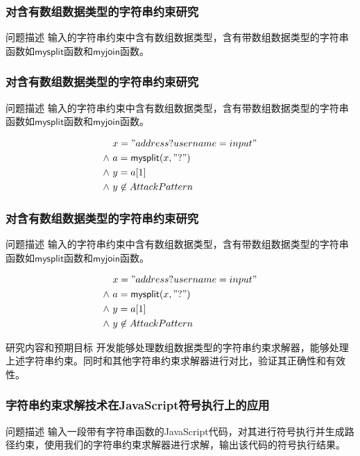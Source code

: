 \documentclass[landscape]{beamer}
\newcommand{\mysplit}{\mathsf{mysplit}}
\newcommand{\myjoin}{\mathsf{myjoin}}
\begin{document}
\begin{frame}[fragile, t]
  \frametitle{对含有数组数据类型的字符串约束研究}
  \begin{block}{问题描述}
    输入的字符串约束中含有数组数据类型，含有带数组数据类型的字符串函数如$\mysplit$函数和$\myjoin$函数。
  \end{block}
\end{frame}

\begin{frame}[fragile, t]
  \frametitle{对含有数组数据类型的字符串约束研究}
  \begin{block}{问题描述}
    输入的字符串约束中含有数组数据类型，含有带数组数据类型的字符串函数如$\mysplit$函数和$\myjoin$函数。
  \end{block}
  \begin{align*}
    & \ x = "address?username=input" \\
    \wedge & \ a = \mysplit(x, "?")\\
    \wedge &\ y = a[1]\\
    \wedge &\ y \not \in AttackPattern\\
  \end{align*}
\end{frame}

\begin{frame}[fragile, t]
  \frametitle{对含有数组数据类型的字符串约束研究}
  \begin{block}{问题描述}
    输入的字符串约束中含有数组数据类型，含有带数组数据类型的字符串函数如$\mysplit$函数和$\myjoin$函数。
  \end{block}
  \begin{align*}
    & \ x = "address?username=input" \\
    \wedge & \ a = \mysplit(x, "?")\\
    \wedge &\ y = a[1]\\
    \wedge &\ y \not \in AttackPattern\\
  \end{align*}
  \begin{block}{研究内容和预期目标}
    开发能够处理数组数据类型的字符串约束求解器，能够处理上述字符串约束。同时和其他字符串约束求解器进行对比，验证其正确性和有效性。
  \end{block}
\end{frame}

\begin{frame}[fragile, t]
  \frametitle{字符串约束求解技术在JavaScript符号执行上的应用}
  \begin{block}{问题描述}
    输入一段带有字符串函数的JavaScript代码，对其进行符号执行并生成路径约束，使用我们的字符串约束求解器进行求解，输出该代码的符号执行结果。
  \end{block}

\end{frame}
\end{document}
